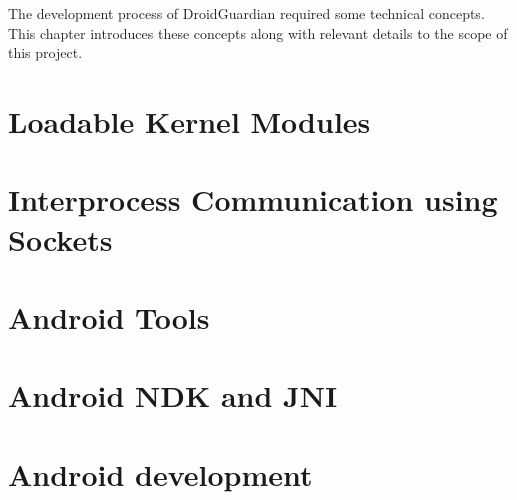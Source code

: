 The development process of DroidGuardian required some technical concepts. This chapter introduces these concepts along with relevant details to the scope of this project.

\section{Loadable Kernel Modules}


\section{Interprocess Communication using Sockets}
\label{sec:sockets}


\section{Android Tools}


\section{Android NDK and JNI}


\section{Android development}

